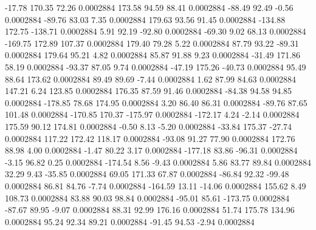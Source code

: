       -17.78      170.35       72.26     0.0002884
      173.58       94.59       88.41     0.0002884
      -88.49       92.49       -0.56     0.0002884
      -89.76       83.03        7.35     0.0002884
      179.63       93.56       91.45     0.0002884
     -134.88      172.75     -138.71     0.0002884
        5.91       92.19      -92.80     0.0002884
      -69.30        9.02       68.13     0.0002884
     -169.75      172.89      107.37     0.0002884
      179.40       79.28        5.22     0.0002884
       87.79       93.22      -89.31     0.0002884
      179.64       95.21        4.82     0.0002884
       85.87       91.88        9.23     0.0002884
      -31.49      171.86       58.19     0.0002884
      -93.37       87.05        9.74     0.0002884
      -47.19      175.26      -40.73     0.0002884
       95.49       88.64      173.62     0.0002884
       89.49       89.69       -7.44     0.0002884
        1.62       87.99       84.63     0.0002884
      147.21        6.24      123.85     0.0002884
      176.35       87.59       91.46     0.0002884
      -84.38       94.58       94.85     0.0002884
     -178.85       78.68      174.95     0.0002884
        3.20       86.40       86.31     0.0002884
      -89.76       87.65      101.48     0.0002884
     -170.85      170.37     -175.97     0.0002884
     -172.17        4.24       -2.14     0.0002884
      175.59       90.12      174.81     0.0002884
       -0.50        8.13       -5.20     0.0002884
      -33.84      175.37      -27.74     0.0002884
      117.22      172.42      118.17     0.0002884
      -93.08       91.27       77.90     0.0002884
      172.76       88.98        4.00     0.0002884
       -1.47       80.22        3.17     0.0002884
     -177.18       83.86      -96.31     0.0002884
       -3.15       96.82        0.25     0.0002884
     -174.54        8.56       -9.43     0.0002884
        5.86       83.77       89.84     0.0002884
       32.29        9.43      -35.85     0.0002884
       69.05      171.33       67.87     0.0002884
      -86.84       92.32      -99.48     0.0002884
       86.81       84.76       -7.74     0.0002884
     -164.59       13.11      -14.06     0.0002884
      155.62        8.49      108.73     0.0002884
       83.88       90.03       98.84     0.0002884
      -95.01       85.61     -173.75     0.0002884
      -87.67       89.95       -9.07     0.0002884
       88.31       92.99      176.16     0.0002884
       51.74      175.78      134.96     0.0002884
       95.24       92.34       89.21     0.0002884
      -91.45       94.53       -2.94     0.0002884
